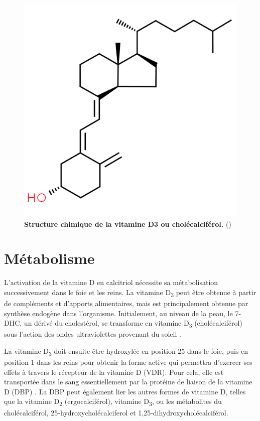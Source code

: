 \documentclass[
  a4paper,
  DIV=11,
  numbers=noendperiod,
  listof=totoc]{scrreprt}
\begin{document}
\begin{figure}
\centering
\includegraphics[width=0.7\columnwidth]{figures/cholecalciferol-chemspider.png} 
\caption[\textbf{Structure chimique de la vitamine D3 ou cholécalciférol.}]{\textbf{Structure chimique de la vitamine D3 ou cholécalciférol.} (\cite{chemspider.2023})}
\label{fig:vitd3}
\end{figure}

\hypertarget{muxe9tabolisme}{%
\section{Métabolisme}\label{muxe9tabolisme}}

L'activation de la vitamine D en calcitriol nécessite sa métabolisation
successivement dans le foie et les reins. La vitamine D\textsubscript{3}
peut être obtenue à partir de compléments et d'apports alimentaires,
mais est principalement obtenue par synthèse endogène dans l'organisme.
Initialement, au niveau de la peau, le \ac{7-DHC}, un dérivé du
cholestérol, se transforme en vitamine D\textsubscript{3}
(cholécalciférol) sous l'action des ondes ultraviolettes provenant du
soleil \autocite{Bikle.2014}.

La vitamine D\textsubscript{3} doit ensuite être hydroxylée en position
25 dans le foie, puis en position 1 dans les reins pour obtenir la forme
active qui permettra d'exercer ses effets à travers le récepteur de la
vitamine D (\acs{VDR}). Pour cela, elle est transportée dans le sang
essentiellement par la protéine de liaison de la vitamine D (\acs{DBP})
\autocite{Christakos.2010,Chun.2012}. La \ac{DBP} peut également lier
les autres formes de vitamine D, telles que la vitamine
D\textsubscript{2} (ergocalciférol), vitamine D\textsubscript{3}, ou les
métabolites du cholécalciférol, 25-hydroxycholécalciferol et
1,25-dihydroxycholécalciférol.
\end{document}
